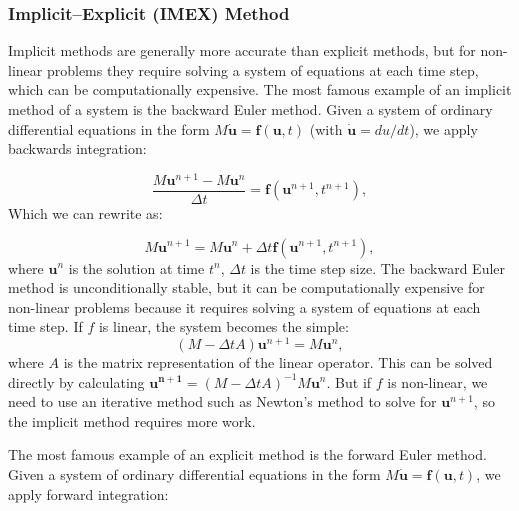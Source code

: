 \subsubsection{Implicit--Explicit (IMEX) Method}\label{subsubsec:num_IMEX}

Implicit methods are generally more accurate than explicit methods, but for non-linear problems they require solving a system of equations at each time step, which can be computationally expensive. The most famous example of an implicit method of a system is the backward Euler method. Given a system of ordinary differential equations in the form $M \dot{\mathbf{u}} = \mathbf{f}(\mathbf{u},t)$ (with $\dot{\mathbf{u}}=du/dt$), we apply backwards integration:

\begin{equation}
    \frac{M\mathbf{u}^{n+1} - M\mathbf{u}^n}{\Delta t}= \mathbf{f}(\mathbf{u}^{n+1},t^{n+1}),
\end{equation}
Which we can rewrite as:

\begin{equation}
M\mathbf{u}^{n+1} = M\mathbf{u}^{n} + \Delta t \mathbf{f}(\mathbf{u}^{n+1},t^{n+1}),
\end{equation}
where $\mathbf{u}^{n}$ is the solution at time $t^{n}$, $\Delta t$ is the time step size. The backward Euler method is unconditionally stable, but it can be computationally expensive for non-linear problems because it requires solving a system of equations at each time step. If $f$ is linear, the system becomes the simple:
\begin{equation}
(M-\Delta t A)\mathbf{u}^{n+1} = M\mathbf{u}^{n},
\end{equation}
where $A$ is the matrix representation of the linear operator. This can be solved directly by calculating $\mathbf{u^{n+1}}=(M-\Delta t A)^{-1}M\mathbf{u}^{n}$. But if $f$ is non-linear, we need to use an iterative method such as Newton's method to solve for $\mathbf{u}^{n+1}$, so the implicit method requires more work. 

The most famous example of an explicit method is the forward Euler method. Given a system of ordinary differential equations in the form $M\dot{\mathbf{u}} = \mathbf{f}(\mathbf{u},t)$, we apply forward integration:

